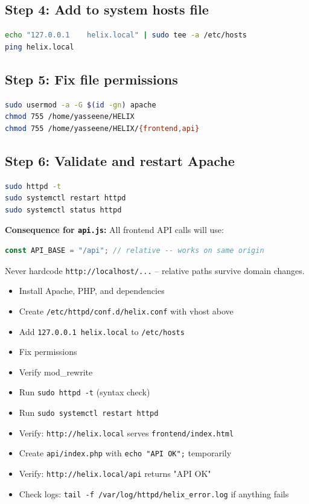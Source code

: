 \documentclass[11pt,a4paper]{report}
\newcommand{\done}{\textcolor{helixteal}{\textbf{[x]}}}
\newcommand{\filepath}[1]{\texttt{\small#1}}
\begin{document}
\subsection*{Step 4: Add to system hosts file}

\begin{lstlisting}[language=bash]
echo "127.0.0.1    helix.local" | sudo tee -a /etc/hosts
ping helix.local
\end{lstlisting}

\subsection*{Step 5: Fix file permissions}

\begin{lstlisting}[language=bash]
sudo usermod -a -G $(id -gn) apache
chmod 755 /home/yasseene/HELIX
chmod 755 /home/yasseene/HELIX/{frontend,api}
\end{lstlisting}

\subsection*{Step 6: Validate and restart Apache}

\begin{lstlisting}[language=bash]
sudo httpd -t
sudo systemctl restart httpd
sudo systemctl status httpd
\end{lstlisting}

\textbf{Consequence for \filepath{api.js}:} All frontend API calls will use:

\begin{lstlisting}[language=JavaScript]
const API_BASE = "/api"; // relative -- works on same origin
\end{lstlisting}

Never hardcode \texttt{http://localhost/...} -- relative paths survive domain changes.

\begin{itemize}
    \item[\done] Install Apache, PHP, and dependencies
    \item[\done] Create \filepath{/etc/httpd/conf.d/helix.conf} with vhost above
    \item[\done] Add \texttt{127.0.0.1 helix.local} to \filepath{/etc/hosts}
    \item[\done] Fix permissions
    \item[\done] Verify mod\_rewrite
    \item[\done] Run \texttt{sudo httpd -t} (syntax check)
    \item[\done] Run \texttt{sudo systemctl restart httpd}
    \item[\done] Verify: \texttt{http://helix.local} serves \filepath{frontend/index.html}
    \item[\done] Create \filepath{api/index.php} with \texttt{echo "API OK";} temporarily
    \item[\done] Verify: \texttt{http://helix.local/api} returns "API OK"
    \item[\done] Check logs: \texttt{tail -f /var/log/httpd/helix\_error.log} if anything fails
\end{itemize}
\end{document}
